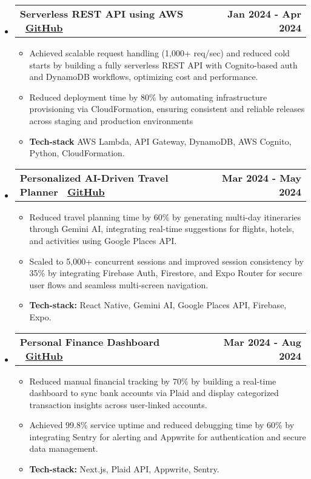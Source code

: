 \documentclass[a4paper, 10pt]{article}
\makeatletter
\newcommand{\resumeProjectHeading}[2]{
    \item
    \begin{tabular*}{\textwidth}[t]{l@{\extracolsep{\fill}}r}
      \textbf{#1} & \textbf{#2}
    \end{tabular*}
    \vspace{-15pt}
}
\makeatother
\begin{document}
    \begin{itemize}[itemsep=1pt,leftmargin=0in, label={}]
        \resumeProjectHeading{Serverless REST API using AWS \textbar\ \href{https://github.com/YashShelar007/Serverless-Architecture}{GitHub}}{Jan 2024 - Apr 2024}
        \begin{itemize}[itemsep=1pt]
            \item Achieved scalable request handling (1,000+ req/sec) and reduced cold starts by building a fully serverless REST API with Cognito-based auth and DynamoDB workflows, optimizing cost and performance. 
            
            \item Reduced deployment time by 80\% by automating infrastructure provisioning via CloudFormation, ensuring consistent and reliable releases across staging and production environments
            
            \item \textbf{Tech-stack} AWS Lambda, API Gateway, DynamoDB, AWS Cognito, Python, CloudFormation.
        \end{itemize}

        \resumeProjectHeading{Personalized AI-Driven Travel Planner \textbar\ \href{https://github.com/YashShelar007/VoyageAI}{GitHub}}{Mar 2024 - May 2024}
        \begin{itemize}[itemsep=1pt]
            \item Reduced travel planning time by 60\% by generating multi-day itineraries through Gemini AI, integrating real-time suggestions for flights, hotels, and activities using Google Places API.
            
            \item Scaled to 5,000+ concurrent sessions and improved session consistency by 35\% by integrating Firebase Auth, Firestore, and Expo Router for secure user flows and seamless multi-screen navigation. 
            
            \item \textbf{Tech-stack:} React Native, Gemini AI, Google Places API, Firebase, Expo.  
        \end{itemize}

        \resumeProjectHeading{Personal Finance Dashboard 
        \textbar\ \href{https://github.com/YashShelar007/WeathWay}{GitHub}}{Mar 2024 - Aug 2024}
        \begin{itemize}[itemsep=1pt]
            \item Reduced manual financial tracking by 70\% by building a real-time dashboard to sync bank accounts via Plaid and display categorized transaction insights across user-linked accounts. 
            
            \item Achieved 99.8\% service uptime and reduced debugging time by 60\% by integrating Sentry for alerting and Appwrite for authentication and secure data management.
            
            \item \textbf{Tech-stack:} Next.js, Plaid API, Appwrite, Sentry.
        \end{itemize}
    \end{itemize}
\end{document}
